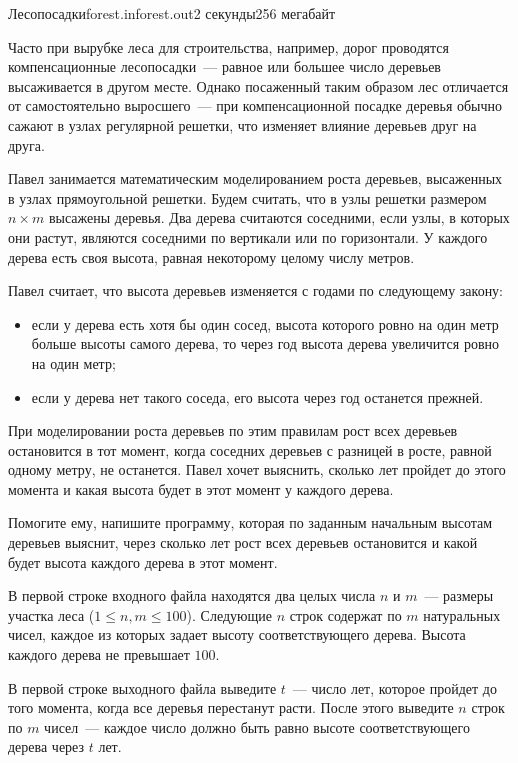 \begin{problem}{Лесопосадки}{forest.in}{forest.out}{2 секунды}{256 мегабайт}


Часто при вырубке леса для строительства, например, дорог проводятся компенсационные
лесопосадки~--- равное или большее число деревьев высаживается в другом месте.
Однако посаженный таким образом лес отличается от самостоятельно выросшего~--- 
при компенсационной посадке деревья обычно сажают в узлах регулярной решетки, 
что изменяет влияние деревьев друг на друга.

Павел занимается математическим моделированием роста деревьев, высаженных
в узлах прямоугольной решетки.
Будем считать, что в узлы решетки размером $n\times m$ высажены деревья. 
Два дерева считаются соседними, если узлы, в которых они растут, являются соседними
по вертикали или по горизонтали. У каждого дерева есть своя высота, 
равная некоторому целому числу метров.

Павел считает, что высота деревьев изменяется с годами по следующему закону: 
\begin{itemize}
\item если у дерева есть хотя бы один сосед, высота которого ровно на один 
метр больше высоты самого дерева, то через год высота дерева увеличится 
ровно на один метр;
\item если у дерева нет такого соседа, его высота через год останется прежней.
\end{itemize}

При моделировании роста деревьев по этим правилам рост всех деревьев остановится 
в тот момент, когда соседних деревьев с разницей в росте, равной одному метру, 
не останется. 
Павел хочет выяснить, сколько лет пройдет до этого момента и какая высота будет в 
этот момент у каждого дерева. 

Помогите ему, напишите программу, которая по заданным начальным высотам деревьев
выяснит, через сколько лет рост всех деревьев остановится и какой будет высота каждого
дерева в этот момент.

\InputFile
В первой строке входного файла находятся два целых числа $n$ 
и $m$~--- размеры участка леса ($1 \le n, m \le 100$). 
Следующие $n$ строк содержат по $m$ натуральных чисел, каждое из которых задает
высоту соответствующего дерева. Высота каждого дерева не превышает $100$.

\OutputFile                        
В первой строке выходного файла выведите $t$~--- число лет, которое пройдет 
до того момента, когда все деревья перестанут расти.
После этого выведите $n$ строк по $m$ чисел~--- 
каждое число должно быть равно высоте соответствующего дерева через $t$ лет. 

\Example
\begin{example}%
%
\end{example}

\end{problem}
